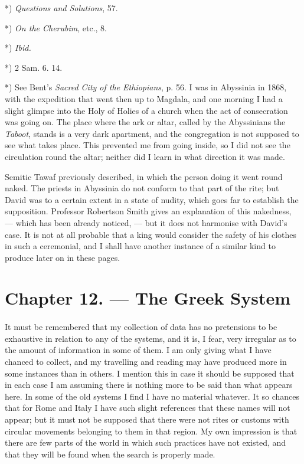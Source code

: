 \documentclass[a4paper, 11pt, oneside, polutonikogreek, english]{article}
\begin{document}
*) \emph{Questions and Solutions}, 57.

*) \emph{On the Cherubim}, etc., 8.

*) \emph{Ibid.}

*) 2 Sam. 6. 14.

*) See Bent's \emph{Sacred City of the Ethiopians}, p. 56. I was in Abyssinia in 1868, with the expedition that went then up to Magdala, and one morning I had a slight glimpse into the Holy of Holies of a church when the act of consecration was going on. The place where the ark or altar, called by the Abyssinians the \emph{Taboot}, stands is a very dark apartment, and the congregation is not supposed to see what takes place. This prevented me from going inside, so I did not see the circulation round the altar; neither did I learn in what direction it was made.

Semitic Tawaf previously described, in which the person doing it went round naked. The priests in Abyssinia do not conform to that part of the rite; but David was to a certain extent in a state of nudity, which goes far to establish the supposition. Professor Robertson Smith gives an explanation of this nakedness, --- which has been already noticed, --- but it does not harmonise with David's case. It is not at all probable that a king would consider the safety of his clothes in such a ceremonial, and I shall have another instance of a similar kind to produce later on in these pages.
\clearpage
\section{Chapter 12. --- The Greek System}
\paragraph{}
It must be remembered that my collection of data has no pretensions to be exhaustive in relation to any of the systems, and it is, I fear, very irregular as to the amount of information in some of them. I am only giving what I have chanced to collect, and my travelling and reading may have produced more in some instances than in others. I mention this in case it should be supposed that in each case I am assuming there is nothing more to be said than what appears here. In some of the old systems I find I have no material whatever. It so chances that for Rome and Italy I have such slight references that these names will not appear; but it must not be supposed that there were not rites or customs with circular movements belonging to them in that region. My own impression is that there are few parts of the world in which such practices have not existed, and that they will be found when the search is properly made.
\end{document}
